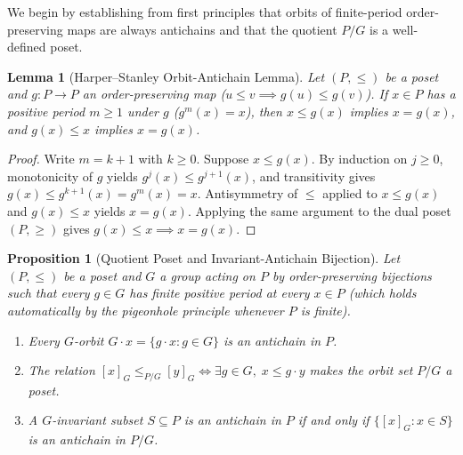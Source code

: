 \documentclass[11pt,a4paper]{article}
\newtheorem{lemma}[theorem]{Lemma}
\newtheorem{proposition}[theorem]{Proposition}
\theoremstyle{definition}
\begin{document}
We begin by establishing from first principles that orbits of finite-period order-preserving maps are always antichains and that the quotient $P/G$ is a well-defined poset.

\begin{lemma}[Harper--Stanley Orbit-Antichain Lemma]\label{lem:orbit-antichain}
Let $(P,\le)$ be a poset and $g : P \to P$ an order-preserving map ($u \le v \implies g(u) \le g(v)$). If $x \in P$ has a positive period $m \ge 1$ under $g$ ($g^m(x) = x$), then $x \le g(x)$ implies $x = g(x)$, and $g(x) \le x$ implies $x = g(x)$.
\end{lemma}

\begin{proof}
Write $m = k + 1$ with $k \ge 0$. Suppose $x \le g(x)$. By induction on $j \ge 0$, monotonicity of $g$ yields $g^j(x) \le g^{j+1}(x)$, and transitivity gives $g(x) \le g^{k+1}(x) = g^m(x) = x$. Antisymmetry of $\le$ applied to $x \le g(x)$ and $g(x) \le x$ yields $x = g(x)$. Applying the same argument to the dual poset $(P, \ge)$ gives $g(x) \le x \implies x = g(x)$.
\end{proof}

\begin{proposition}[Quotient Poset and Invariant-Antichain Bijection]\label{prop:quotient}
Let $(P,\le)$ be a poset and $G$ a group acting on $P$ by order-preserving bijections such that every $g \in G$ has finite positive period at every $x \in P$ (which holds automatically by the pigeonhole principle whenever $P$ is finite).
\begin{enumerate}
  \item[(a)] Every $G$-orbit $G \cdot x = \{g \cdot x : g \in G\}$ is an antichain in $P$.
  \item[(b)] The relation $[x]_G \le_{P/G} [y]_G \iff \exists g \in G,\; x \le g \cdot y$ makes the orbit set $P/G$ a poset.
  \item[(c)] A $G$-invariant subset $S \subseteq P$ is an antichain in $P$ if and only if $\{[x]_G : x \in S\}$ is an antichain in $P/G$.
\end{enumerate}
\end{proposition}
\end{document}
